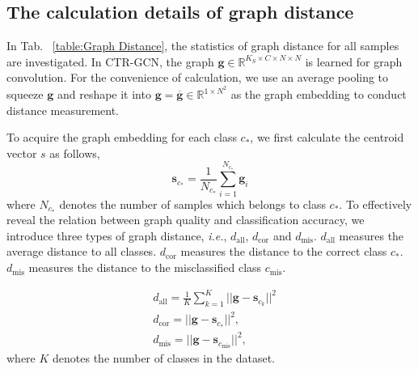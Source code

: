 \documentclass{article} \usepackage{iclr2023_conference,times}
\begin{document}
\subsection{The calculation details of graph distance}
\label{app. graph distance}
In Tab. ~\ref{table:Graph Distance}, the statistics of graph distance for all samples are investigated. In CTR-GCN, the graph $\mathbf{g} \in \mathbb{R}^{K_S \times C \times N \times N}$ is learned for graph convolution. For the convenience of calculation, we use an average pooling to squeeze $\mathbf{g}$ and reshape it into $\bm{g} =\overline{\mathbf{g}} \in \mathbb{R}^{1\times N^2}$ as the graph embedding to conduct distance measurement. 

To acquire the graph embedding for each class $c_*$, we first calculate the centroid vector $s$ as follows,
\begin{equation}
    \bm{s}_{c_*} = \frac{1}{N_{c_*}} \sum_{i=1}^{N_{c_*}} {\bm{g}_i} 
\end{equation}
where $N_{c_*}$ denotes the number of samples which belongs to class $c_*$.
To effectively reveal the relation between graph quality and classification accuracy, we introduce three types of graph distance, \emph{i.e.}, $d_\text{all}$, $d_\text{cor}$ and $d_\text{mis}$. $d_\text{all}$ measures the average distance to all classes. $d_\text{cor}$ measures the distance to the correct class $c_*$. $d_\text{mis}$ measures the distance to the misclassified class $c_{\text{mis}}$.   

\begin{align}
    &d_\text{all} = \frac{1}{K} \sum_{k=1}^K ||\bm{g} - \bm{s}_{c_k}||^2 \\
    &d_\text{cor} = ||\bm{g} - \bm{s}_{c_*}||^2, \\
    &d_\text{mis} = ||\bm{g} - \bm{s}_{c_{\text{mis}}}||^2,  
\end{align}
where $K$ denotes the number of classes in the dataset.
\end{document}
